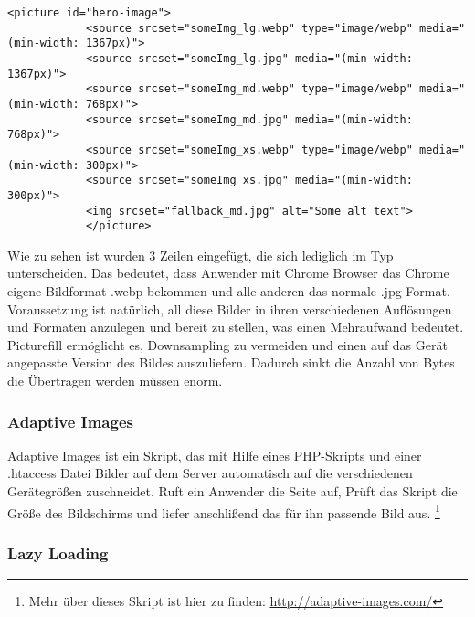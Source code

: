 			\begin{lstlisting}[captionpos=b, caption=Srcset mit webp, label=lst:srcsetWebp]
			<picture id="hero-image">
		    <source srcset="someImg_lg.webp" type="image/webp" media="(min-width: 1367px)">
		    <source srcset="someImg_lg.jpg" media="(min-width: 1367px)">
		    <source srcset="someImg_md.webp" type="image/webp" media="(min-width: 768px)">
		    <source srcset="someImg_md.jpg" media="(min-width: 768px)">
		    <source srcset="someImg_xs.webp" type="image/webp" media="(min-width: 300px)">
		    <source srcset="someImg_xs.jpg" media="(min-width: 300px)">
		    <img srcset="fallback_md.jpg" alt="Some alt text">
			</picture>
			\end{lstlisting}

			Wie zu sehen ist wurden 3 Zeilen eingefügt, die sich lediglich im Typ unterscheiden. Das bedeutet, dass Anwender mit Chrome Browser das Chrome eigene Bildformat .webp bekommen und alle anderen das normale .jpg Format. Voraussetzung ist natürlich, all diese Bilder in ihren verschiedenen Auflösungen und Formaten anzulegen und bereit zu stellen, was einen Mehraufwand bedeutet.
			Picturefill ermöglicht es, Downsampling zu vermeiden und einen auf das Gerät angepasste Version des Bildes auszuliefern. Dadurch sinkt die Anzahl von Bytes die Übertragen werden müssen enorm.



		\subsubsection{Adaptive Images} %
		\label{ssub:adaptive_images}
			Adaptive Images ist ein Skript, das mit Hilfe eines PHP-Skripts und einer .htaccess Datei Bilder auf dem Server automatisch auf die verschiedenen Gerätegrößen zuschneidet. Ruft ein Anwender die Seite auf, Prüft das Skript die Größe des Bildschirms und liefer anschlißend das für ihn passende Bild aus. \footnote{Mehr über dieses Skript ist hier zu finden: \url{http://adaptive-images.com/}}


		\subsubsection{Lazy Loading} %
		\label{ssub:lazy_loading}
		


